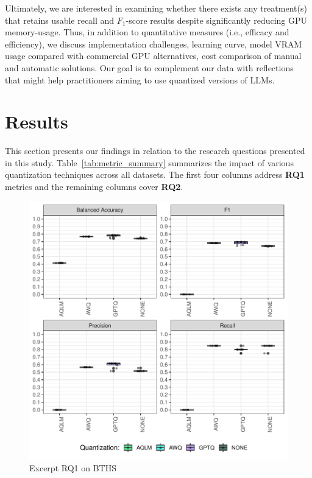 \documentclass[conference]{IEEEtran}
\begin{document}


Ultimately, we are interested in examining whether there exists any treatment(s) that retains usable recall and $F_1$-score results despite significantly reducing GPU memory-usage. Thus, in addition to quantitative measures (i.e., efficacy and efficiency), we discuss implementation challenges, learning curve, model VRAM usage compared with commercial GPU alternatives, cost comparison of manual and automatic solutions. Our goal is to complement our data with reflections that might help practitioners aiming to use quantized versions of LLMs.


\section{Results}



This section presents our findings in relation to the research questions presented in this study. Table~\ref{tab:metric_summary} summarizes the impact of various quantization techniques across all datasets. The first four columns address \textbf{RQ1} metrics and the remaining columns cover \textbf{RQ2}.

\begin{figure}[ht]
    \centering
    \includegraphics[width=0.8\columnwidth]{images/RQ1_box_plot_BTHS.pdf}
    \caption{Excerpt RQ1 on BTHS}
    \label{fig:RQ1_boxplot_BTHS}
\end{figure}
\end{document}

